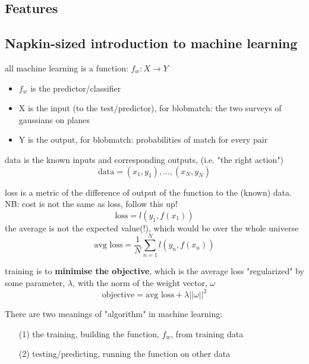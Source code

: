 \documentclass[12pt,a4paper]{article}
\begin{document}
\subsection{Features}
\subsection{Napkin-sized introduction to machine learning}

all machine learning is a function:
$f_w: X \rightarrow Y$
\begin{itemize}
    \item $f_w$ is the predictor/classifier
    \item X is the input (to the test/predictor), for blobmatch: the two surveys of gaussians on planes
    \item Y is the output, for blobmatch: probabilities of match for every pair
\end{itemize}

data is the known inputs and corresponding outputs, (i.e. "the right action")
$$\text{data} = (x_1,y_1), \ldots, (x_N,y_N)$$

loss is a metric of the difference of output of the function to the (known) data. NB: cost is not the same as loss, follow this up!
$$\text{loss} = l(y_1,f(x_1))$$
the average is not the expected value(!), which would be over the whole universe
$$\text{avg  loss} = \frac{1}{N} \sum_{n=1}^N l(y_n,f(x_n))$$

training is to \textbf{minimise the objective}, which is the average loss "regularized" by some parameter, $\lambda$, with the norm of the weight vector, $\omega$
$$\text{objective} = \text{avg loss} + \lambda ||\omega||^2$$

There are two meanings of "algorithm" in machine learning:
\begin{itemize}
    \item[(1)] the training, building the function, $f_w$, from training data
    \item[(2)] testing/predicting, running the function on other data
\end{itemize}

\end{document}
